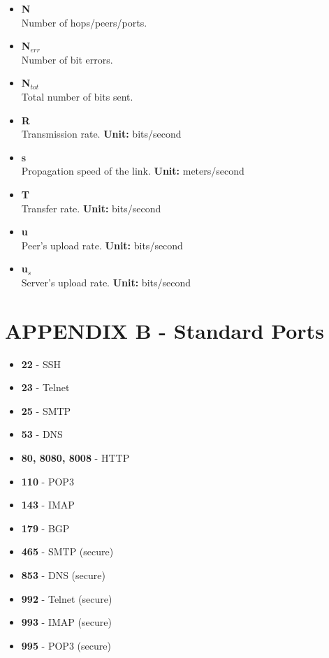 \documentclass{article}
\begin{document}
\begin{itemize}
	\item \textbf{N}
	\vspace{.2cm} \\
	Number of hops/peers/ports.
	
	\item \textbf{N$_{err}$}
	\vspace{.2cm} \\
	Number of bit errors.
	
	\item \textbf{N$_{tot}$}
	\vspace{.2cm} \\
	Total number of bits sent.
	
	\item \textbf{R}
	\vspace{.2cm} \\
	Transmission rate. \textbf{Unit:} bits/second
	
	\item \textbf{s}
	\vspace{.2cm} \\
	Propagation speed of the link. \textbf{Unit:} meters/second
	
	\item \textbf{T}
	\vspace{.2cm} \\
	Transfer rate. \textbf{Unit:} bits/second
	
	\item \textbf{u}
	\vspace{.2cm} \\
	Peer's upload rate. \textbf{Unit:} bits/second
	
	\item \textbf{u$_s$}
	\vspace{.2cm} \\
	Server's upload rate. \textbf{Unit:} bits/second
\end{itemize}

\newpage

\section{APPENDIX B - Standard Ports}
\begin{itemize}
	\item \textbf{22} - SSH
	\item \textbf{23} - Telnet
	\item \textbf{25} - SMTP
	\item \textbf{53} - DNS
	\item \textbf{80, 8080, 8008} - HTTP
	\item \textbf{110} - POP3
	\item \textbf{143} - IMAP
	\item \textbf{179} - BGP
    \item \textbf{465} - SMTP (secure)
    \item \textbf{853} - DNS (secure)
    \item \textbf{992} - Telnet (secure)
	\item \textbf{993} - IMAP (secure)
	\item \textbf{995} - POP3 (secure)
\end{itemize}
\end{document}
